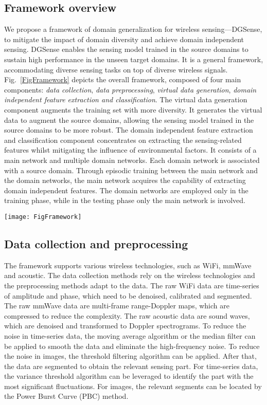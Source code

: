 \documentclass[journal]{IEEEtran}
\begin{document}
\subsection{Framework overview}
We propose a framework of domain generalization for wireless sensing---DGSense, to mitigate the impact of domain diversity and achieve domain independent sensing. DGSense enables the sensing model trained in the source domains to sustain high performance in the unseen target domains. It is a general framework, accommodating diverse sensing tasks on top of diverse wireless signals. Fig.~\ref{FigFramework} depicts the overall framework, composed of four main components: \textit{data collection}, \textit{data preprocessing}, \textit{virtual data generation}, \textit{domain independent feature extraction and classification}. The virtual data generation component augments the training set with more diversity. It generates the virtual data to augment the source domains, allowing the sensing model trained in the source domains to be more robust. The domain independent feature extraction and classification component concentrates on extracting the sensing-related features whilst mitigating the influence of environmental factors. It consists of a main network and multiple domain networks. Each domain network is associated with a source domain. Through episodic training between the main network and the domain networks, the main network acquires the capability of extracting domain independent features. The domain networks are employed only in the training phase, while in the testing phase only the main network is involved.

\begin{figure*}
\centerline{\texttt{[image: FigFramework]}}
\caption{The domain generalization framework (DGSense).}
\label{FigFramework}
\end{figure*}

\subsection{Data collection and preprocessing}
The framework supports various wireless technologies, such as WiFi, mmWave and acoustic. The data collection methods rely on the wireless technologies and the preprocessing methods adapt to the data. The raw WiFi data are time-series of amplitude and phase, which need to be denoised, calibrated and segmented. The raw mmWave data are multi-frame range-Doppler maps, which are compressed to reduce the complexity. The raw acoustic data are sound waves, which are denoised and transformed to Doppler spectrograms. To reduce the noise in time-series data, the moving average algorithm or the median filter can be applied to smooth the data and eliminate the high-frequency noise. To reduce the noise in images, the threshold filtering algorithm can be applied. After that, the data are segmented to obtain the relevant sensing part. For time-series data, the variance threshold algorithm can be leveraged to identify the part with the most significant fluctuations. For images, the relevant segments can be located by the Power Burst Curve (PBC) method. 
\end{document}
